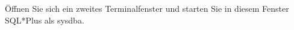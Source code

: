         \item Öffnen Sie sich ein zweites Terminalfenster und starten Sie in diesem Fenster SQL*Plus als sysdba.
